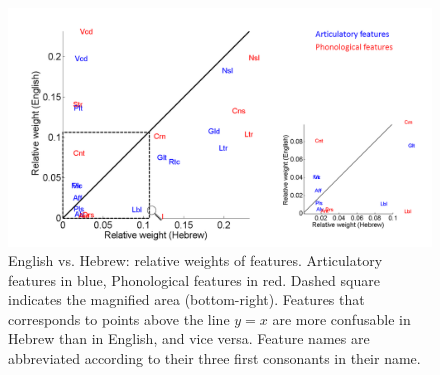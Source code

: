 \begin{figure}
\vspace{.3in}
\includegraphics[width=\linewidth]{Figures/Ch2/compare_Heb_Luce.PNG}
\caption{English vs. Hebrew: relative weights of features. Articulatory features in blue, Phonological features in red. Dashed square indicates the magnified area (bottom-right). Features that corresponds to points above the line $y=x$ are more confusable in Hebrew than in English, and vice versa. Feature names are abbreviated according to their three first consonants in their name.}
\end{figure}